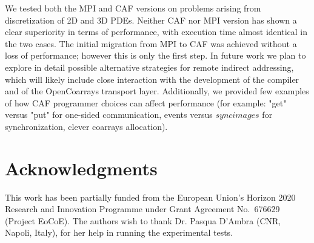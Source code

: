 \documentclass{IOS-Book-Article}
\begin{document}
We tested both the MPI and CAF versions on problems arising from
discretization of 2D and 3D PDEs. Neither CAF nor MPI version has
shown a clear superiority in terms of performance, with execution time
almost identical in the two cases.  The initial migration from MPI to CAF
was achieved without  a loss of performance; however this is only the
first step. In future work we plan to explore in detail possible
alternative strategies for remote indirect addressing, which will
likely include close interaction with the development of the compiler
and of the OpenCoarrays transport layer.
Additionally, we provided few examples of how CAF programmer choices
can affect performance (for example: "get" versus "put" for one-sided
communication, events versus $sync images$ for synchronization, clever
coarrays allocation). 

\section{Acknowledgments} 
This work has been partially funded  from the European Union's Horizon 2020 Research
and Innovation Programme under Grant Agreement No.~676629
(Project EoCoE).
The authors wish to thank Dr. Pasqua D'Ambra (CNR, Napoli, Italy),
for her help in running the experimental tests.
 


\end{document}
